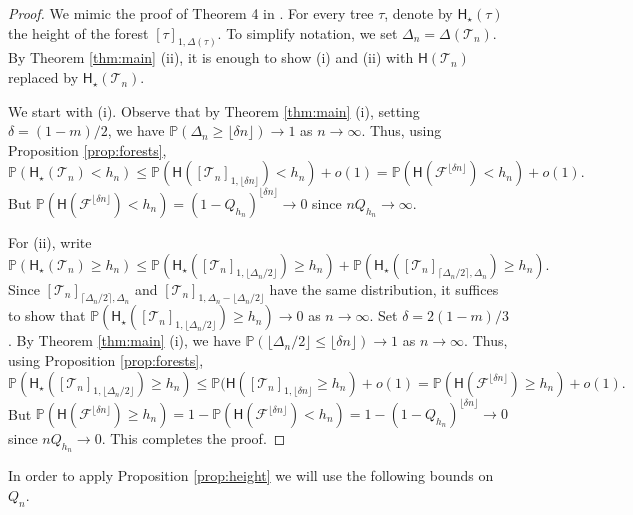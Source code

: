 \documentclass[a4paper,11pt]{article}
\DeclareRobustCommand{\P}{\mathbb{P}}
\begin{document}
\begin{proof}
We mimic the proof of Theorem 4 in \cite {Kortchemski_2013}. For every tree $\tau$, denote by $\mathsf{H}_{\star}(\tau)$ the height of the forest $ [\tau]_{1,\Delta(\tau)}$. To simplify notation, we set $\Delta_{n}=\Delta(\mathcal{T}_{n})$. By Theorem \ref{thm:main} (ii), it is enough to show (i) and (ii) with $\mathsf{H}(\mathcal{T}_n) $ replaced by $\mathsf{H}_{\star}(\mathcal{T}_n) $. 

We start with (i). Observe that by Theorem \ref{thm:main} (i), setting $\delta=(1-m)/2$, we have $ \P(\Delta_{n} \geq  \lfloor \delta n \rfloor) \rightarrow 1$ as $n \rightarrow \infty$. Thus, using Proposition \ref{prop:forests},
$$\P(\mathsf{H}_{\star}(\mathcal{T}_n) <  h_{n}) \leq  \P(\mathsf{H}( [\mathcal{T}_{n}]_{1, \lfloor \delta n \rfloor}) < h_{n})+o(1) =   \P(\mathsf{H}( \mathcal{F}^{ \lfloor \delta n\rfloor}) < h_{n})+o(1).$$
But $\P(\mathsf{H}( \mathcal{F}^{ \lfloor \delta n\rfloor}) < h_{n})=(1-Q_{h_{n}})^{\lfloor \delta n \rfloor} \rightarrow 0$
since $n Q_{ h_{n}} \rightarrow \infty$.

For (ii), write
$$\P(\mathsf{H}_{\star}(\mathcal{T}_n) \geq h_{n}) \leq \P(\mathsf{H}_{\star}([\mathcal{T}_n]_{1,\lfloor \Delta_{n}/2\rfloor})\geq h_{n})+\P(\mathsf{H}_{\star}([\mathcal{T}_n]_{\lceil \Delta_{n}/2\rceil,\Delta_{n}})\geq h_{n}).$$
Since $[\mathcal{T}_n]_{\lceil \Delta_{n}/2\rceil,\Delta_{n}}$ and $[\mathcal{T}_n]_{1,\Delta_{n}-\lfloor \Delta_{n}/2\rfloor}$ have the same distribution, it suffices to show that $ \P(\mathsf{H}_{\star}([\mathcal{T}_n]_{1,\lfloor \Delta_{n}/2\rfloor})\geq h_{n}) \rightarrow 0$ as $n \rightarrow \infty$. Set $\delta=2(1-m)/3$. By Theorem \ref{thm:main} (i), we have $ \P(\lfloor \Delta_{n}/2\rfloor \leq \lfloor \delta n \rfloor) \rightarrow 1$ as $n \rightarrow \infty$.  Thus, using Proposition \ref{prop:forests},
$$ \P(\mathsf{H}_{\star}([\mathcal{T}_n]_{1,\lfloor \Delta_{n}/2\rfloor})\geq h_{n}) \leq  \P(\mathsf{H}( [\mathcal{T}_{n}]_{1, \lfloor \delta n \rfloor} \geq  h_{n})+o(1) = \P(\mathsf{H}( \mathcal{F}^{ \lfloor \delta n\rfloor}) \geq h_{n})+o(1).$$
But $ \P(\mathsf{H}( \mathcal{F}^{ \lfloor \delta n\rfloor}) \geq h_{n})=1-\P(\mathsf{H}( \mathcal{F}^{ \lfloor \delta n\rfloor}) <  h_{n})=1-(1-Q_{h_{n}})^{\lfloor \delta n \rfloor} \rightarrow 0$
since $n Q_{ h_{n}} \rightarrow 0$.
This completes the proof.
\end{proof}

In order to apply Proposition \ref{prop:height} we will use the following bounds on $Q_{n}$.
\end{document}
